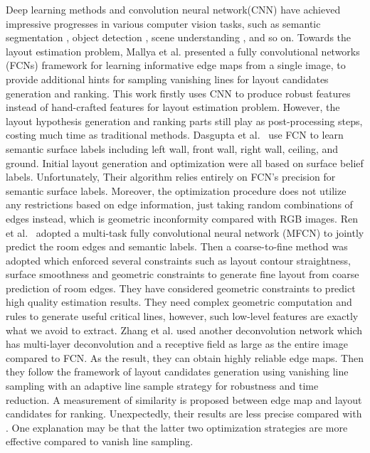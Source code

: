 Deep learning methods and convolution neural network(CNN) have achieved impressive progresses in various computer vision tasks, such as semantic segmentation \cite{long2015fully,chen2016deeplab}, object detection \cite{girshick2015fast,ren2015faster}, scene understanding \cite{gupta2015indoor,badrinarayanan2017segnet}, and so on.
%
Towards the layout estimation problem, Mallya et al.\cite{mallya2015learning} presented a fully convolutional networks (FCNs) framework for learning informative edge maps from a single image, to provide additional hints for sampling vanishing lines for layout candidates generation and ranking. 
%
This work firstly uses CNN to produce robust features instead of hand-crafted features for layout estimation problem. However, the layout hypothesis generation and ranking parts still play as post-processing steps, costing much time as traditional methods. 
%
Dasgupta et al.~\cite{dasgupta2016delay} use FCN to learn semantic surface labels including left wall, front wall, right wall, ceiling, and ground. 
Initial layout generation and optimization were all based on surface belief labels. 
Unfortunately, Their algorithm relies entirely on FCN's precision for semantic surface labels. 
%
Moreover, the optimization procedure does not utilize any restrictions based on edge information, just taking random combinations of edges instead, which is geometric inconformity compared with RGB images. 
%
Ren et al.~\cite{ren2016coarse} adopted a multi-task fully convolutional neural network (MFCN) to jointly predict the room edges and semantic labels. 
Then a coarse-to-fine method was adopted which enforced several constraints such as layout contour straightness, surface smoothness and geometric constraints to generate fine layout from coarse prediction of room edges. 
%
They have considered geometric constraints to predict high quality estimation results. They need complex geometric computation and rules to generate useful critical lines, however, such low-level features are exactly what we avoid to extract. 
%
Zhang et al.\cite{zhang2016learning} used another deconvolution network which has multi-layer deconvolution and a receptive field as large as the entire image compared to FCN. As the result, they can obtain highly reliable edge maps. Then they follow the framework of layout candidates generation using vanishing line sampling with an adaptive line sample strategy for robustness and time reduction. A measurement of similarity is proposed between edge map and layout candidates for ranking. 
Unexpectedly, their results are less precise compared with \cite{dasgupta2016delay,ren2016coarse}. 
One explanation may be that the latter two optimization strategies are more effective compared to vanish line sampling.
%

